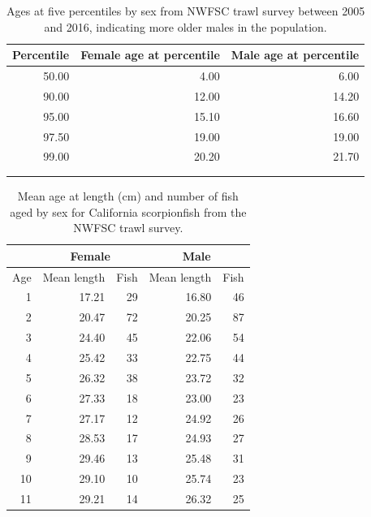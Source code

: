\documentclass[12pt,]{article}
\begin{document}
\begin{table}[ht]
\centering
\caption{Ages at five percentiles by sex from 
                                          NWFSC trawl survey between 2005 and 2016, 
                                          indicating more older males in the population.} 
\label{tab:Fleet8_NWFSCTrawl_agepercents}
\begin{tabular}{rrr}
  \hline
Percentile & Female age at percentile & Male age at percentile \\ 
  \hline
50.00 & 4.00 & 6.00 \\ 
  90.00 & 12.00 & 14.20 \\ 
  95.00 & 15.10 & 16.60 \\ 
  97.50 & 19.00 & 19.00 \\ 
  99.00 & 20.20 & 21.70 \\ 
   &  &  \\ 
   &  &  \\ 
   \hline
\end{tabular}
\end{table}\begin{table}[ht]
\centering
\caption{Mean age at length (cm) and number of 
                                                    fish aged by sex for 
                                                    California scorpionfish from the NWFSC
                                                      trawl survey.} 
\label{tab:Fleet8_NWFSCTrawl_meanAatL}
\begin{tabular}{rrrrr}
  &  \multicolumn{2}{c}{Female} 
                                   &  \multicolumn{2}{c}{Male} \\
 \hline
Age & Mean  length & Fish & Mean length & Fish \\ 
  \hline
  1 & 17.21 &  29 & 16.80 &  46 \\ 
    2 & 20.47 &  72 & 20.25 &  87 \\ 
    3 & 24.40 &  45 & 22.06 &  54 \\ 
    4 & 25.42 &  33 & 22.75 &  44 \\ 
    5 & 26.32 &  38 & 23.72 &  32 \\ 
    6 & 27.33 &  18 & 23.00 &  23 \\ 
    7 & 27.17 &  12 & 24.92 &  26 \\ 
    8 & 28.53 &  17 & 24.93 &  27 \\ 
    9 & 29.46 &  13 & 25.48 &  31 \\ 
   10 & 29.10 &  10 & 25.74 &  23 \\ 
   11 & 29.21 &  14 & 26.32 &  25 \\ 

\end{tabular}
\end{table}
\end{document}
